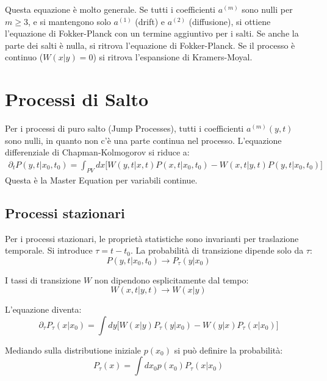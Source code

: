 Questa equazione è molto generale. Se tutti i coefficienti $a^{(m)}$ sono nulli per $m \ge 3$, e si mantengono solo $a^{(1)}$ (drift) e $a^{(2)}$ (diffusione), si ottiene l'equazione di Fokker-Planck con un termine aggiuntivo per i salti. Se anche la parte dei salti è nulla, si ritrova l'equazione di Fokker-Planck. Se il processo è continuo ($W(x|y)=0$) si ritrova l'espansione di Kramers-Moyal.

\section{Processi di Salto}
Per i processi di puro salto (Jump Processes), tutti i coefficienti $a^{(m)}(y,t)$ sono nulli, in quanto non c'è una parte continua nel processo. L'equazione differenziale di Chapman-Kolmogorov si riduce a:
\begin{equation*} 
\begin{aligned}
\partial_t P(y,t|x_0,t_0) =\int_{PV} dx \Biggl [W(y,t|x,t)P(x,t|x_0,t_0) - W(x,t|y,t)P(y,t|x_0,t_0) \Biggr] 
\end{aligned} 
\end{equation*}
Questa è la Master Equation per variabili continue.

\subsection{Processi stazionari}
Per i processi stazionari, le proprietà statistiche sono invarianti per traslazione temporale. Si introduce $\tau = t - t_0$. La probabilità di transizione dipende solo da $\tau$:
\begin{equation}
P(y,t|x_0,t_0) \rightarrow P_{\tau}(y|x_0)
\end{equation}

I tassi di transizione $W$ non dipendono esplicitamente dal tempo:
\begin{equation}
W(x,t|y,t) \rightarrow W(x|y)
\end{equation}

L'equazione diventa:
\begin{equation}
\partial_{\tau} P_{\tau}(x|x_0) = \int dy \biggl[W(x|y)P_{\tau}(y|x_0) - W(y|x)P_{\tau}(x|x_0)\biggr]
\end{equation}

Mediando sulla distributione iniziale $p(x_0)$ si può definire la probabilità:
\begin{equation} 
P_{\tau}(x) = \int dx_0 p(x_0) P_{\tau}(x|x_0) 
\end{equation}

